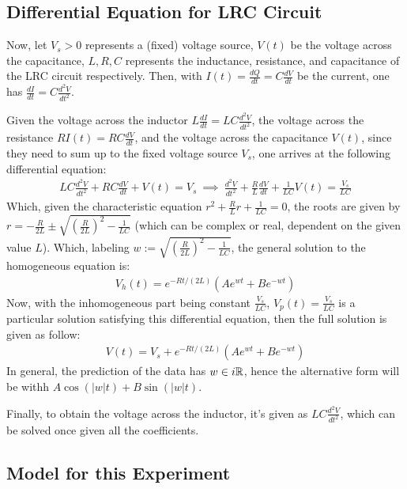 \documentclass{article}
\begin{document}
\hfil

\subsection{Differential Equation for LRC Circuit}

Now, let $V_s>0$ represents a (fixed) voltage source, $V(t)$ be the voltage across the capacitance, $L,R,C$ represents the inductance, resistance, and capacitance of the LRC circuit respectively. Then, with $I(t)=\frac{dQ}{dt}=C\frac{dV}{dt}$ be the current, one has $\frac{dI}{dt} = C\frac{d^2V}{dt^2}$.

Given the voltage across the inductor $L\frac{dI}{dt} = LC \frac{d^2V}{dt^2}$, the voltage across the resistance $RI(t)=RC\frac{dV}{dt}$, and the voltage across the capacitance $V(t)$, since they need to sum up to the fixed voltage source $V_s$, one arrives at the following differential equation:
\begin{align}
    LC\frac{d^2V}{dt^2}+RC\frac{dV}{dt}+V(t)=V_s\ \implies\ \frac{d^2V}{dt^2}+\frac{R}{L}\frac{dV}{dt}+\frac{1}{LC}V(t)=\frac{V_s}{LC}
\end{align}
Which, given the characteristic equation $r^2+\frac{R}{L}r+\frac{1}{LC}=0$, the roots are given by $r = -\frac{R}{2L}\pm \sqrt{\left(\frac{R}{2L}\right)^2-\frac{1}{LC}}$ (which can be complex or real, dependent on the given value $L$). Which, labeling $w := \sqrt{\left(\frac{R}{2L}\right)^2-\frac{1}{LC}}$, the general solution to the homogeneous equation is:
\begin{align}
    V_h(t) = e^{-Rt/(2L)}\left(Ae^{w t}+Be^{-wt}\right)
\end{align}
Now, with the inhomogeneous part being constant $\frac{V_s}{LC}$, $V_p(t)=\frac{V_s}{LC}$ is a particular solution satisfying this differential equation, then the full solution is given as follow:
\begin{align}
    V(t)=V_s + e^{-Rt/(2L)}\left(Ae^{w t}+Be^{-wt}\right)
\end{align}
In general, the prediction of the data has $w\in i\mathbb{R}$, hence the alternative form will be withh $A \cos(|w|t)+B\sin(|w|t)$.

Finally, to obtain the voltage across the inductor, it's given as $LC \frac{d^2V}{dt^2}$, which can be solved once given all the coefficients.

\hfil

\subsection{Model for this Experiment}
\end{document}
